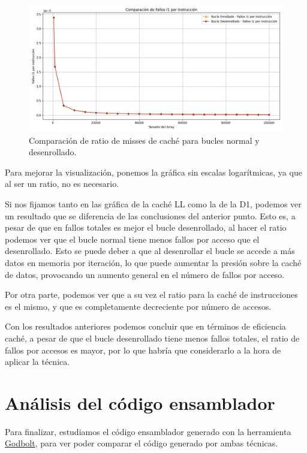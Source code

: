 \documentclass[a4paper,twocolumn]{article}
\begin{document}
\begin{enumerate}
    \begin{figure}[H]
        \centering
        \includegraphics[width=\columnwidth]{img/cacheRatioI1.png}
        \caption{Comparación de ratio de misses de caché para bucles normal y desenrollado.}
        \label{fig:real_vs_cpu_time}
    \end{figure}

    Para mejorar la visualización, ponemos la gráfica sin escalas logarítmicas, ya que al ser un ratio, no es necesario. 

    Si nos fijamos tanto en las gráfica de la caché LL como la de la D1, podemos ver un resultado que se diferencia de las conclusiones del anterior punto. Esto es, a pesar de que en fallos totales es mejor el bucle desenrollado, al hacer el ratio podemos ver que el bucle normal tiene menos fallos por acceso que el desenrollado. Esto se puede deber a que al desenrollar el bucle se accede a más datos en memoria por iteración, lo que puede aumentar la presión sobre la caché de datos, provocando un aumento general en el número de fallos por acceso.

    Por otra parte, podemos ver que a su vez el ratio para la caché de instrucciones es el mismo, y que es completamente decreciente por número de accesos.
\end{enumerate}

Con los resultados anteriores podemos concluir que en términos de eficiencia caché, a pesar de que el bucle desenrollado tiene menos fallos totales, el ratio de fallos por accesos es mayor, por lo que habría que considerarlo a la hora de aplicar la técnica.

\section{Análisis del código ensamblador}

Para finalizar, estudiamos el código ensamblador generado con la herramienta \href{https://godbolt.org/}{Godbolt}, para ver poder comparar el código generado por ambas técnicas.
\end{document}

